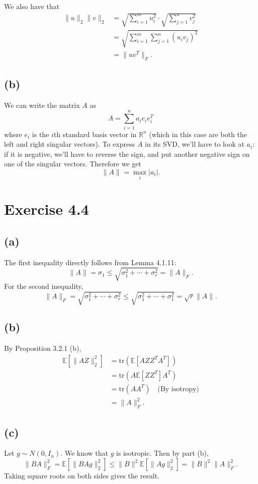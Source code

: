 We also have that 
\begin{align*}
	\lVert u \rVert_{2}\lVert v \rVert_{2} 
	&= \sqrt{\sum_{i = 1}^{m} u_i^2} \cdot \sqrt{\sum_{j = 1}^{n} v_j^2} \\
	&= \sqrt{\sum_{i = 1}^{m}\sum_{j = 1}^{n} (u_iv_j)^2} \\
	&= \lVert uv^T \rVert_{F}.
\end{align*}

\subsection*{(b)}
We can write the matrix $A$ as 
\[ A = \sum_{i = 1}^{n} a_i e_i e_i^T \]
where $e_i$ is the $i$th standard basis vector in $\mathbb{R}^n$ (which in this case are both the left and right 
singular vectors). To express $A$ in its SVD, we'll have to look at $a_i$: if it is negative, we'll have to 
reverse the sign, and put another negative sign on one of the singular vectors. Therefore we get
\[ \lVert A \rVert_{} = \max_{i} |a_i|. \]


\newpage
\section*{Exercise 4.4}
\subsection*{(a)}
The first inequality directly follows from Lemma 4.1.11:
\[ \lVert A \rVert_{} = \sigma_1 \leq \sqrt{\sigma_1^2 + \cdots + \sigma_r^2} = \lVert A \rVert_{F}. \]
For the second inequality, 
\[ \lVert A \rVert_{F} = \sqrt{\sigma_1^2 + \cdots + \sigma_r^2} \leq \sqrt{\sigma_1^2 + \cdots + \sigma_1^2} 
= \sqrt{r}\lVert A \rVert_{}. \]

\subsection*{(b)}
By Proposition 3.2.1 (b), 
\begin{align*}
	\mathbb{E}\left[ \lVert AZ \rVert_{2}^2 \right]
	&= \mathrm{tr}(\mathbb{E}\left[ AZZ^T A^T \right]) \\
	&= \mathrm{tr}(A \mathbb{E}\left[ ZZ^T \right] A^T) \\
	&= \mathrm{tr}(AA^T) \quad \text{(By isotropy)} \\
	&= \lVert A \rVert_{F}^2.
\end{align*}

\subsection*{(c)}
Let $g \sim N(0, I_n)$. We know that $g$ is isotropic. Then by part (b), 
\[ \lVert BA \rVert_{F}^2 = \mathbb{E}\left[ \lVert BAg \rVert_{2}^2 \right] 
\leq \lVert B \rVert_{}^2 \mathbb{E}\left[ \lVert Ag \rVert_{2}^2 \right] = \lVert B \rVert_{}^2 
\lVert A \rVert_{F}^2. \]
Taking square roots on both sides gives the result.

